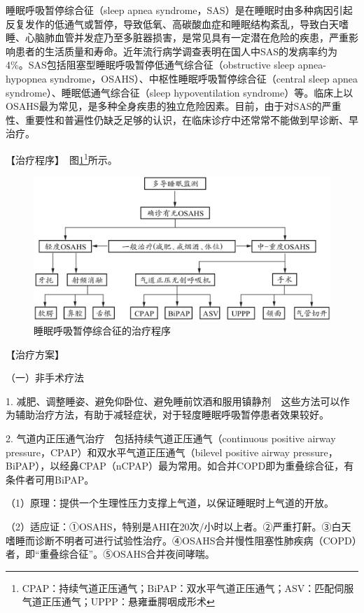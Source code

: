 睡眠呼吸暂停综合征（sleep apnea
syndrome，SAS）是在睡眠时由多种病因引起反复发作的低通气或暂停，导致低氧、高碳酸血症和睡眠结构紊乱，导致白天嗜睡、心脑肺血管并发症乃至多脏器损害，是常见具有一定潜在危险的疾患，严重影响患者的生活质量和寿命。近年流行病学调查表明在国人中SAS的发病率约为4\%。SAS包括阻塞型睡眠呼吸暂停低通气综合征（obstructive
sleep apnea-hypopnea
syndrome，OSAHS）、中枢性睡眠呼吸暂停综合征（central sleep apnea
syndrome）、睡眠低通气综合征（sleep hypoventilation
syndrome）等。临床上以OSAHS最为常见，是多种全身疾患的独立危险因素。目前，由于对SAS的严重性、重要性和普遍性仍缺乏足够的认识，在临床诊疗中还常常不能做到早诊断、早治疗。

【治疗程序】　图\ref{fig1-16-1}\footnote{CPAP：持续气道正压通气；BiPAP：双水平气道正压通气；ASV：匹配伺服气道正压通气；UPPP：悬雍垂腭咽成形术}所示。

\begin{figure}[!htbp]
 \centering
 \includegraphics{./images/Image00039.jpg}
 \captionsetup{justification=centering}
 \caption{睡眠呼吸暂停综合征的治疗程序}
 \label{fig1-16-1}
  \end{figure} 

【治疗方案】

{（一）非手术疗法}

1.
减肥、调整睡姿、避免仰卧位、避免睡前饮酒和服用镇静剂　这些方法可以作为辅助治疗方法，有助于减轻症状，对于轻度睡眠呼吸暂停患者效果较好。

2. 气道内正压通气治疗　包括持续气道正压通气（continuous positive airway
pressure，CPAP）和双水平气道正压通气（bilevel positive airway
pressure，BiPAP），以经鼻CPAP（nCPAP）最为常用。如合并COPD即为重叠综合征，有条件者可用BiPAP。

（1）原理：提供一个生理性压力支撑上气道，以保证睡眠时上气道的开放。

（2）适应证：①OSAHS，特别是AHI在20次/小时以上者。②严重打鼾。③白天嗜睡而诊断不明者可进行试验性治疗。④OSAHS合并慢性阻塞性肺疾病（COPD）者，即“重叠综合征”。⑤OSAHS合并夜间哮喘。

